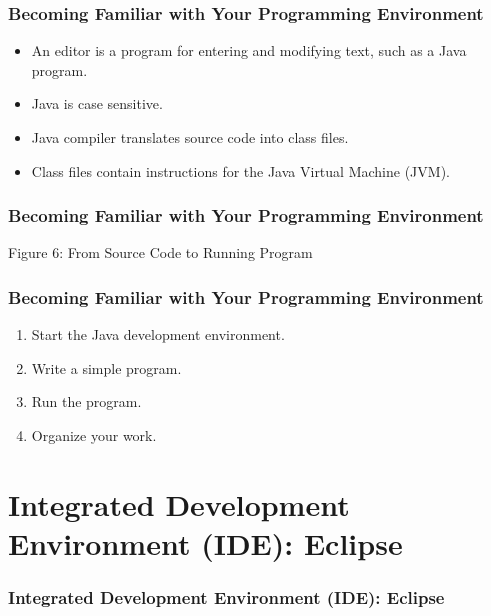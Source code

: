 \documentclass{beamer}
\begin{document}
\begin{frame}[t,fragile] \frametitle{Becoming Familiar with Your Programming Environment} %
    \begin{itemize}
        \item An editor is a program for entering and modifying text, such as a Java program.
        \item Java is case sensitive.
        \item Java compiler translates source code into class files.
        \item Class files contain instructions for the Java Virtual Machine (JVM).
    \end{itemize}
\end{frame}

\begin{frame}[t,fragile] \frametitle{Becoming Familiar with Your Programming Environment} %
    \begin{center}
        Figure 6: From Source Code to Running Program
    \end{center}
\end{frame}

\begin{frame}[t,fragile] \frametitle{Becoming Familiar with Your Programming Environment} %
    \begin{enumerate}
        \item Start the Java development environment.
        \item Write a simple program.
        \item Run the program.
        \item Organize your work.
    \end{enumerate}
\end{frame}

\section{Integrated Development Environment (IDE): Eclipse}

\begin{frame}[t,fragile] \frametitle{Integrated Development Environment (IDE): Eclipse} %
\end{frame}
\end{document}
